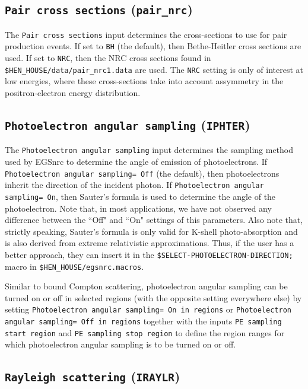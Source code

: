 \documentclass[12pt,twoside]{article}
\begin{document}
\subsection{ {\tt Pair cross sections} ({\tt pair\_nrc})}

The {\tt Pair cross sections} input determines the cross-sections to
use for pair production events.  If set to {\tt BH} (the default), then
Bethe-Heitler cross sections are used.  If set to {\tt NRC}, then the
NRC cross sections found in {\tt \$HEN\_HOUSE/data/pair\_nrc1.data} are
used.  The {\tt NRC} setting is only of interest at low energies, where
these cross-sections take into account assymmetry in the positron-electron
energy distribution.

\subsection{ {\tt Photoelectron angular sampling} ({\tt IPHTER})}

The {\tt Photoelectron angular sampling} input determines the sampling method
used by EGSnrc to determine the angle of emission of photoelectrons.
If {\tt Photoelectron angular sampling= Off} (the default), then
 photoelectrons inherit the direction of the incident photon.  If
{\tt Photoelectron angular sampling= On}, then Sauter's formula
\cite{Sa31} is used to determine the angle of the photoelectron.  Note
that, in most applications, we have not observed any difference between
the ``Off" and ``On" settings of this parameters.  Also note that,
strictly speaking, Sauter's formula is only valid for K-shell photo-absorption
and is also derived from extreme relativistic approximations.  Thus, if
the user has a better approach, they can insert it in the
{\tt \$SELECT-PHOTOELECTRON-DIRECTION;} macro in
{\tt \$HEN\_HOUSE/egsnrc.macros}.

Similar to bound Compton scattering, photoelectron angular sampling
can be turned on or off in selected regions (with the opposite setting
everywhere else) by setting
{\tt Photoelectron angular sampling= On in regions} or
{\tt Photoelectron angular sampling= Off in regions} together with
the inputs {\tt PE sampling start region} and
{\tt PE sampling stop region} to define the region ranges for which
photoelectron angular sampling is to be turned on or off.

\subsection{ {\tt Rayleigh scattering} ({\tt IRAYLR})}
\label{rayleighsect}
\end{document}
